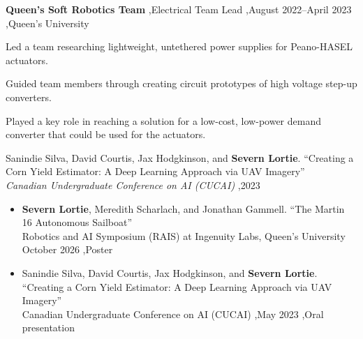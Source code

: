 \documentclass[letterpaper,10pt]{article}
\newenvironment{cvdetails}
  {%
    \begin{list}{\textbullet}{%
      \setlength{\leftmargin}{1.3em}%
      \setlength{\rightmargin}{0pt}%
      \setlength{\labelwidth}{0.6em}%
      \setlength{\labelsep}{0.4em}%
      \setlength{\itemindent}{0pt}%
      \setlength{\listparindent}{0pt}%
      \setlength{\topsep}{3pt}%
      \setlength{\partopsep}{0pt}%
      \setlength{\itemsep}{2pt}%
      \setlength{\parsep}{0pt}%
    }%
  }
  {\end{list}}
\begin{document}
\begin{itemize}
\item
  \textbf{Queen's Soft Robotics Team}
  \sep Electrical Team Lead \sep August 2022--April 2023 \sep Queen's University

  \begin{cvdetails}
    \item Led a team researching lightweight, untethered power supplies for Peano-HASEL
    actuators.
    \item Guided team members through creating circuit prototypes of high voltage step-up
    converters.
    \item Played a key role in reaching a solution for a low-cost, low-power demand converter that
    could be used for the actuators.
  \end{cvdetails}  


\end{itemize}



\begin{etaremune}

\item
  Sanindie Silva, David Courtis, Jax Hodgkinson, and \textbf{Severn Lortie}.
  ``Creating a Corn Yield Estimator: A Deep Learning Approach via UAV Imagery''\\
  \textit{Canadian Undergraduate Conference on AI (CUCAI)} \sep 2023

\end{etaremune}



\begin{itemize}

\item
  \textbf{Severn Lortie}, Meredith Scharlach, and Jonathan Gammell.
  ``The Martin 16 Autonomous Sailboat''\\
  Robotics and AI Symposium (RAIS) at Ingenuity Labs, Queen's University\\ October 2026
  \sep Poster

\item
  Sanindie Silva, David Courtis, Jax Hodgkinson, and \textbf{Severn Lortie}.
  ``Creating a Corn Yield Estimator: A Deep Learning Approach via UAV Imagery''\\
  Canadian Undergraduate Conference on AI (CUCAI) \sep May 2023
  \sep Oral presentation

\end{itemize}
\end{document}
